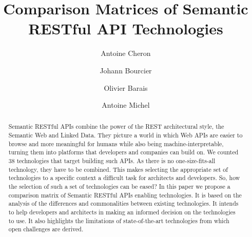 \documentclass[runningheads]{llncs}
\begin{document}
%
\title{Comparison Matrices of Semantic RESTful API Technologies}
%
%
\author{Antoine Cheron \and
Johann Bourcier \and
Olivier Barais \and
Antoine Michel}
%
%
%
\maketitle              %

\begin{abstract}
Semantic RESTful APIs combine the power of the REST architectural style, the Semantic Web and Linked Data. They picture a world in which Web APIs are easier to browse and more meaningful for humans while also being machine-interpretable, turning them into platforms that developers and companies can build on. We counted 38 technologies that target building such APIs. As there is no one-size-fits-all technology, they have to be combined. This makes selecting the appropriate set of technologies to a specific context a difficult task for architects and developers. So, how the selection of such a set of technologies can be eased? 
In this paper we propose a comparison matrix of Semantic RESTful APIs enabling technologies. It is based on the analysis of the differences and commonalities between existing technologies. It intends to help developers and architects in making an informed decision on the technologies to use. It also highlights the limitations of state-of-the-art technologies from which open challenges are derived.

\end{abstract}
%







%
%
%
% 
% 
%



\end{document}
